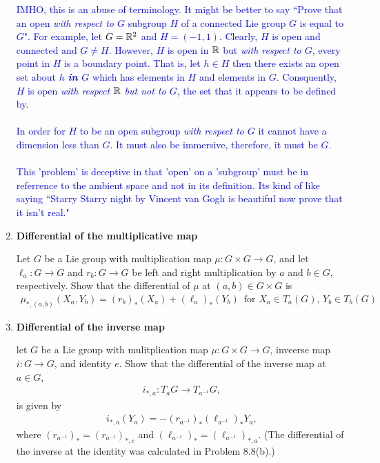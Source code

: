 \documentclass[12pt,a4paper]{report}
\newcommand{\BLUE}[1]{\textcolor{blue}{#1}}
\begin{document}
\begin{enumerate}[label=\textbf{15.\arabic*.}]
	\BLUE{IMHO, this is an abuse of terminology.  It might be better to say ``Prove that an open \textit{with respect to $G$} subgroup $H$ of a connected Lie group $G$ is equal to $G$".  For example, let $G = \mathbb{R}^2$ and $H = (-1,1)$.  Clearly, $H$ is open and connected and $G \ne H$.  However, $H$ is open in $\mathbb{R}$ but \textit{with respect to $G$}, every point in $H$ is a boundary point.  That is, let $h\in H$ then there exists an open set about $h$ \textbf{\textit{in $G$}} which has elements in $H$ and elements in $G$. Consquently, $H$ is open  \textit{with respect $\mathbb{R}$ but not to $G$}, the set that it appears to be defined by. \\ \\
	In order for $H$ to be an open subgroup \textit{with respect to $G$} it cannot have a dimension less than $G$.  It must also be immersive, therefore, it must be $G$.\\
	\\
	This 'problem' is deceptive in that 'open' on a 'subgroup' must be in referrence to the ambient space and not in its definition.  Its kind of like saying ``Starry Starry night by Vincent van Gogh is beautiful now prove that it isn't real."
	}
	
	\item \textbf{Differential of the multiplicative map}
	
	Let $G$ be a Lie group with multiplication map $\mu:G \times G \to G$, and let $\ell_a:G \to G$ and $r_b: G \to G$ be left and right multiplication by $a$ and $b \in G$, respectively.  Show that the differential of $\mu$ at $(a,b)\in G \times G$ is 
	\begin{align*}
		\mu_{*,(a,b)}(X_a, Y_b) = (r_b)_{*}(X_a)+(\ell_a)_*(Y_b)\, \text{ for }X_a\in T_a(G),\, Y_b\in T_b(G)
	\end{align*}
	
	\item \textbf{Differential of the inverse map}
	
	let $G$ be a Lie group with mulitplication map $\mu:G\times G\to G$, inveerse map $i:G \to G$, and identity $e$.  Show that the differential of the inverse map at $a \in G$,
	\begin{align*}
		i_{*,a}:T_aG\to T_{a^{-1}}G,
	\end{align*}is given by 
	\begin{align*}
		i_{*,a}(Y_a) = -(r_{a^{-1}})_*(\ell_{a^{-1}})_*Y_a,
	\end{align*}where $(r_{a^{-1}})_*=(r_{a^{-1}})_{*,e}$ and $(\ell_{a^{-1}})_*=(\ell_{a^{-1}})_{*,a}$. (The differential of the inverse at the identity was calculated in Problem 8.8(b).)
	

\end{enumerate}
\end{document}
